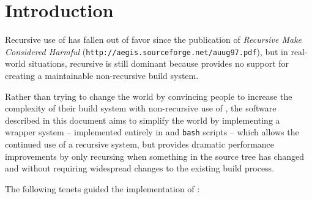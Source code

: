 %
%
%
%
\chapter{Introduction}

Recursive use of \make has fallen out of favor since the publication
of \emph{Recursive Make Considered Harmful}
(\texttt{http://aegis.sourceforge.net/auug97.pdf}), but in real-world
situations, recursive \make is still dominant because \make provides
no support for creating a maintainable non-recursive build system.

Rather than trying to change the world by convincing people to
increase the complexity of their build system with non-recursive use
of \make, the software described in this document aims to simplify the
world by implementing a wrapper system -- implemented entirely in
\gnumake and \texttt{bash} scripts -- which allows the continued use
of a recursive \make system, but provides dramatic performance
improvements by only recursing when something in the source tree has
changed and without requiring widespread changes to the existing build
process.

The following tenets guided the implementation of \lmsbw:

